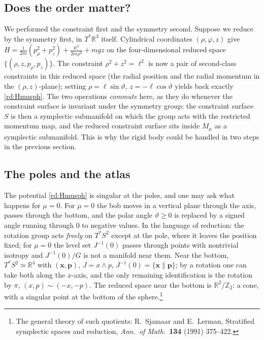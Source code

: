 \subsection{Does the order matter?}\label{rd:sec:order}

We performed the constraint first and the symmetry second. Suppose we reduce by the symmetry first, in $T^*\mathbb R^3$ itself. Cylindrical coordinates $(\rho,\varphi,z)$ give $H=\frac1{2m}(p_\rho^2+p_z^2)+\frac{\mu^2}{2m\rho^2}+mgz$ on the four-dimensional reduced space $\{(\rho,z,p_\rho,p_z)\}$. The constraint $\rho^2+z^2=\ell^2$ is now a pair of second-class constraints in this reduced space (the radial position and the radial momentum in the $(\rho,z)$-plane); setting $\rho=\ell\sin\vartheta$, $z=-\ell\cos\vartheta$ yields back exactly \eqref{rd:Hmusph}. The two operations \emph{commute} here, as they do whenever the constraint surface is invariant under the symmetry group: the constraint surface $S$ is then a symplectic submanifold on which the group acts with the restricted momentum map, and the reduced constraint surface sits inside $M_\mu$ as a symplectic submanifold. This is why the rigid body could be handled in two steps in the previous section.

\subsection{The poles and the atlas}\label{rd:sec:poles}

The potential \eqref{rd:Hmusph} is singular at the poles, and one may ask what happens for $\mu=0$. For $\mu=0$ the bob moves in a vertical plane through the axis, passes through the bottom, and the polar angle $\vartheta\ge0$ is replaced by a signed angle running through $0$ to negative values. In the language of reduction: the rotation group acts \emph{freely} on $T^*S^2$ except at the pole, where it leaves the position fixed; for $\mu=0$ the level set $J^{-1}(0)$ passes through points with nontrivial isotropy and $J^{-1}(0)/G$ is not a manifold near them. Near the bottom, $T^*S^2\simeq\mathbb R^4$ with $(\mathbf x,\mathbf p)$, $J=x\wedge p$, $J^{-1}(0)=\{\mathbf x\parallel\mathbf p\}$; by a rotation one can take both along the $x$-axis, and the only remaining identification is the rotation by $\pi$, $(x,p)\sim(-x,-p)$. The reduced space near the bottom is $\mathbb R^2/\mathbb Z_2$: a cone, with a singular point at the bottom of the sphere.\footnote{The general theory of such quotients: R.\ Sjamaar and E.\ Lerman, Stratified symplectic spaces and reduction, \emph{Ann.\ of Math.}\ \textbf{134} (1991) 375--422.}

